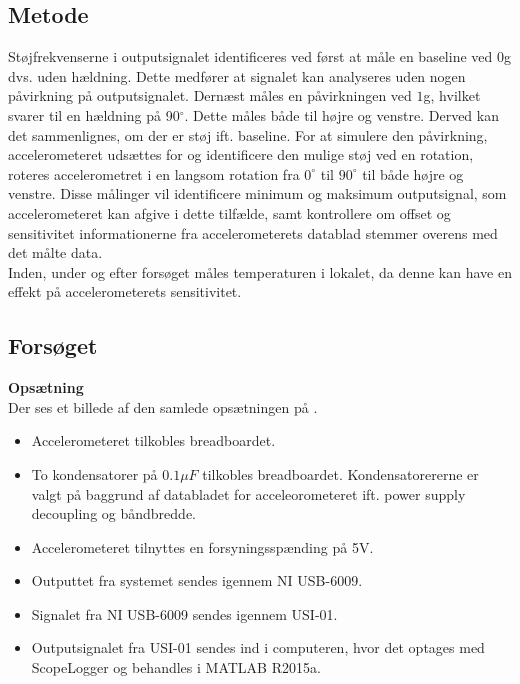 \subsection{Metode}
Støjfrekvenserne i outputsignalet identificeres ved først at måle en baseline ved $0$g dvs. uden hældning. Dette medfører at signalet kan analyseres uden nogen påvirkning på outputsignalet. Dernæst måles en påvirkningen ved $1$g, hvilket svarer til en hældning på 90$^{\circ}$. Dette måles både til højre og venstre. Derved kan det sammenlignes, om der er støj ift. baseline. %
For at simulere den påvirkning, accelerometeret udsættes for og identificere den mulige støj ved en rotation, roteres accelerometret i en langsom rotation fra $0^{\circ}$ til $90^{\circ}$ til både højre og venstre. Disse målinger vil identificere minimum og maksimum outputsignal, som accelerometeret kan afgive i dette tilfælde, samt kontrollere om offset og sensitivitet informationerne fra accelerometerets datablad stemmer overens med det målte data. \\
Inden, under og efter forsøget måles temperaturen i lokalet, da denne kan have en effekt på accelerometerets sensitivitet. \cite{Devices2009}

\subsection{Forsøget}
\textbf{Opsætning}\\
Der ses et billede af den samlede opsætningen på .
\begin{itemize}
\item Accelerometeret tilkobles breadboardet.
\item To kondensatorer på $0.1 \mu F$ tilkobles breadboardet. Kondensatorererne er valgt på baggrund af databladet for acceleorometeret ift. power supply decoupling og båndbredde.
\item Accelerometeret tilnyttes en forsyningsspænding på 5V.
\item Outputtet fra systemet sendes igennem NI USB-6009.
\item Signalet fra NI USB-6009 sendes igennem USI-01. 
\item Outputsignalet fra USI-01 sendes ind i computeren, hvor det optages med ScopeLogger og behandles i MATLAB R2015a.
\end{itemize}

